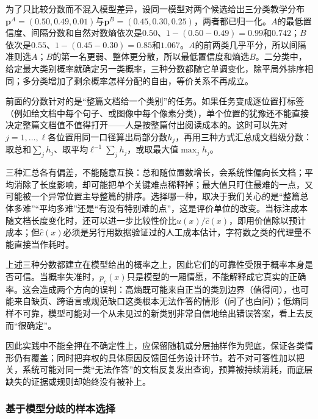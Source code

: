 \begin{example}[三种不确定性分数可能给出不同排序]
  \label{ex:knowledge-acquisition-human-uncertainty-scores}
  为了只比较分数而不混入模型差异，设同一模型对两个候选给出三分类教学分布$\bm{p}^{A}=(0.50,0.49,0.01)$与$\bm{p}^{B}=(0.45,0.30,0.25)$，两者都已归一化。$A$的最低置信度、间隔分数和自然对数熵依次是$0.50$、$1-(0.50-0.49)=0.99$和$0.742$；$B$依次是$0.55$、$1-(0.45-0.30)=0.85$和$1.067$。$A$的前两类几乎平分，所以间隔准则选$A$；$B$的第一名更弱、整体更分散，所以最低置信度和熵选$B$。二分类中，给定最大类别概率就确定另一类概率，三种分数都随它单调变化，除平局外排序相同；多分类增加了剩余概率怎样分配的自由，等价关系不再成立。
\end{example}

前面的分数针对的是“整篇文档给一个类别”的任务。如果任务变成逐位置打标签（例如给文档中每个句子、或图像中每个像素分类），单个位置的犹豫还不能直接决定整篇文档值不值得打开——人是按整篇付出阅读成本的。这时可以先对$j=1,\ldots,\ell$各位置用同一口径算出局部分数$h_j$，再用三种方式汇总成文档级分数：取总和$\sum_jh_j$、取平均$\ell^{-1}\sum_jh_j$，或取最大值$\max_jh_j$。

三种汇总各有偏差，不能随意互换：总和随位置数增长，会系统性偏向长文档；平均消除了长度影响，却可能把单个关键难点稀释掉；最大值只盯住最难的一点，又可能被一个异常位置主导整篇的排序。选择哪一种，取决于我们关心的是“整篇总体多难”“平均多难”还是“有没有特别难的点”，这是评价单位的改变。当标注成本随文档长度变化时，还可以进一步比较性价比$u(x)/\widehat c(x)$，即用价值除以预计成本；但$\widehat c(x)$必须是另行用数据验证过的人工成本估计，字符数之类的代理量不能直接当作耗时。

上述三种分数都建立在模型给出的概率之上，因此它们的可靠性受限于概率本身是否可信。当概率失准时，$p_c(x)$只是模型的一厢情愿，不能解释成它真实的正确率。这会造成两个方向的误判：高熵既可能来自正当的类别边界（值得问），也可能来自缺页、跨语言或规范缺口这类根本无法作答的情形（问了也白问）；低熵同样不可靠，模型可能对一个从未见过的新类别非常自信地给出错误答案，看上去反而“很确定”。

因此实践中不能全押在不确定性上，应保留随机或分层抽样作为兜底，保证各类情形仍有覆盖；同时把弃权的具体原因反馈回任务设计环节。若不对可答性加以把关，系统可能对同一类“无法作答”的文档反复发出查询，预算被持续消耗，而底层缺失的证据或规则却始终没有被补上。

\subsubsection{基于模型分歧的样本选择}
\label{sec:knowledge-acquisition-human-model-disagreement}


